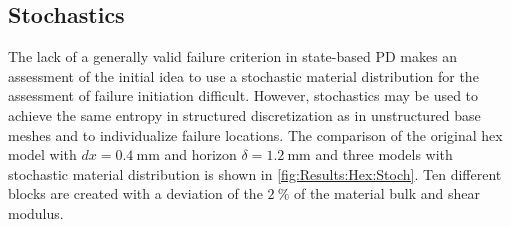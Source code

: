 \subsection{Stochastics}

The lack of a generally valid failure criterion in state-based PD makes an assessment of the initial idea to use a stochastic material distribution for the assessment of failure initiation difficult. However, stochastics may be used to achieve the same entropy in structured discretization as in unstructured base meshes and to individualize failure locations. The comparison of the original hex model with $dx=\SI{0.4}{\milli\meter}$ and horizon $\delta=\SI{1.2}{\milli\meter}$ and three models with stochastic material distribution is shown in \autoref{fig:Results:Hex:Stoch}. Ten different blocks are created with a deviation of the $\SI{2}{\percent}$ of the material bulk and shear modulus.


